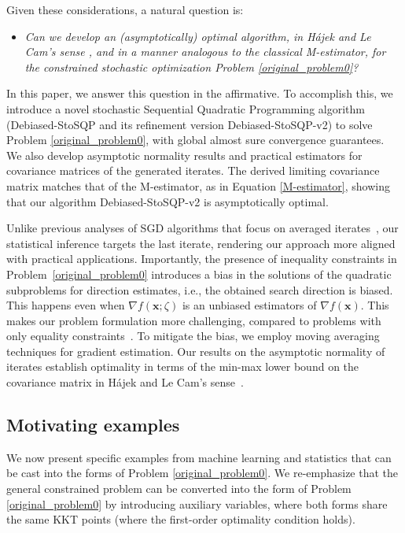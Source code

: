 \documentclass[aos]{imsart}
\numberwithin{equation}{section}
\theoremstyle{plain}
\begin{document}
Given these considerations, a natural question is: 
\begin{itemize}
\item \textit{Can we develop an (asymptotically) optimal algorithm, in H\'ajek and Le Cam's sense \cite{le2000asymptotics, van2000asymptotic}, and in a manner analogous to the classical M-estimator, for the constrained stochastic optimization Problem \eqref{original_problem0}?}
\end{itemize}


\noindent 
In this paper, we answer this question in the affirmative. 
To accomplish this, we introduce a novel stochastic Sequential Quadratic Programming algorithm (Debiased-StoSQP and its refinement version Debiased-StoSQP-v2)
to solve Problem \eqref{original_problem0}, with global almost sure convergence guarantees.
We also develop asymptotic normality results and practical estimators for covariance matrices of the generated iterates. The derived limiting covariance matrix matches that of the M-estimator, as in Equation \eqref{M-estimator}, showing that our algorithm Debiased-StoSQP-v2 is asymptotically optimal. 

Unlike previous analyses of SGD algorithms that focus on averaged iterates~\cite{polyak1992acceleration, chen2020statistical}, our statistical inference targets the last iterate, rendering our approach more aligned with practical applications.
Importantly, the presence of inequality constraints in Problem~\eqref{original_problem0} introduces a bias in the solutions of the quadratic subproblems for direction estimates, i.e., the obtained search direction is biased. 
This happens even when $\nabla f(\bm{x}; \zeta)$ is an unbiased estimators of $\nabla f(\bm{x})$.
This makes our problem formulation more challenging, compared to problems with only equality constraints~\cite{berahas2021sequential, na2022asymptotic}. 
To mitigate the bias, we employ moving averaging techniques for gradient estimation. 
Our results on the asymptotic normality of iterates establish optimality in terms of the min-max lower bound on the covariance matrix in H\'ajek and Le Cam's sense~\cite{le2000asymptotics, van2000asymptotic}.



\subsection{Motivating examples}
\label{sec:1.1}
We now present specific examples from machine learning and statistics that can be cast into the forms of Problem \eqref{original_problem0}. We re-emphasize that the general constrained problem can be converted into the form of Problem \eqref{original_problem0} by introducing auxiliary variables, where both forms share the same KKT points (where the first-order optimality condition holds). 
\end{document}
